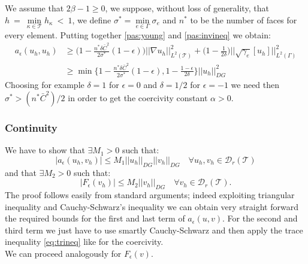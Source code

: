 \documentclass[12pt, a4paper]{article}
\theoremstyle{definition}
\theoremstyle{plain}
\theoremstyle{plain}
\theoremstyle{definition}
\begin{document}
We assume that $2\beta - 1 \geq 0$, we suppose, without loss of generality, 
that 
$h~=~\min\limits_{\kappa \in \mathcal{T}} h_\kappa~<~1$, we define $\sigma^* = 
\min\limits_{e \in \Gamma} \sigma_e$ and $n^*$ to be the number of faces for 
every element. Putting together \eqref{pas:young} and \eqref{pas:invineq} we 
obtain:
\begin{equation*}
\begin{split}
a_\epsilon(u_h, u_h) &\geq \big(1 - \frac{n^*\delta\bar{C}^2}{2\sigma^*} (1-\epsilon)\big) \big|\!\big| \nabla u_h \big|\!\big|^2_{L^2(\mathcal{T})}
+ \big(1 - \frac{1}{2\delta} \big) \bigg|\!\bigg| \sqrt{\gamma_e} [u_h] \bigg|\!\bigg|^2_{L^2(\Gamma)}\\
&\geq \min\bigg\{1 - \frac{n^*\delta\bar{C}^2}{2\sigma^*} (1-\epsilon) , 1 - \frac{1-\epsilon}{2\delta}\bigg\} |\!|u_h|\!|^2_{DG}
\end{split}
\end{equation*}
Choosing for example $\delta = 1$ for $\epsilon = 0$ and  $\delta = 1/2$ for 
$\epsilon = -1 $ we need then $\sigma^* > (n^*\bar{C}^2)/2$ in order to get the 
coercivity constant $\alpha > 0$.
\subsubsection{Continuity}
We have to show that $\exists M_1 > 0$ such that:
\begin{equation*}
	|a_\epsilon(u_h, v_h)| \leq M_1 |\!|u_h|\!|_{DG} |\!|v_h|\!|_{DG} \quad 
	\forall u_h, v_h \in \mathcal{D}_r(\mathcal{T})
\end{equation*}
and that $\exists M_2 > 0$ such that:
\begin{equation*}
	|F_\epsilon(v_h)| \leq M_2 |\!|v_h|\!|_{DG} \quad \forall v_h \in 
	\mathcal{D}_r(\mathcal{T}).
\end{equation*}
The proof follows easily from standard arguments; indeed exploiting triangular inequality and Cauchy-Schwarz's inequality we can obtain very straight forward the required bounds for the first and last term of $a_\epsilon(u, v)$. For the second and third term we just have to use smartly Cauchy-Schwarz and then apply the trace inequality \eqref{eq:trineq} like for the coercivity.\\
We can proceed analogously for $F_\epsilon(v)$.
\end{document}

